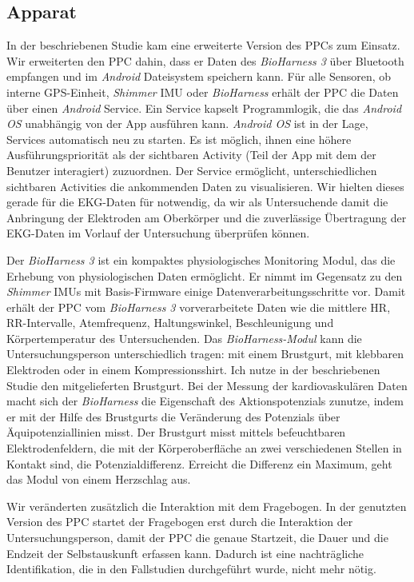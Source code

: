 \subsection{Apparat}
In der beschriebenen Studie kam eine erweiterte Version des \ac{PPC}s zum Einsatz. Wir erweiterten den \ac{PPC} dahin, dass er Daten des \emph{BioHarness 3} über Bluetooth empfangen und im \emph{Android} Dateisystem speichern kann. Für alle Sensoren, ob interne \ac{GPS}-Einheit, \emph{Shimmer} \ac{IMU} oder \emph{BioHarness} erhält der \ac{PPC} die Daten über einen \emph{Android} Service. Ein Service kapselt Programmlogik, die das \emph{Android OS} unabhängig von der App ausführen kann. \emph{Android OS} ist in der Lage, Services automatisch neu zu starten. Es ist möglich, ihnen eine höhere Ausführungspriorität als der sichtbaren Activity (Teil der App mit dem der Benutzer interagiert) zuzuordnen. Der Service ermöglicht, unterschiedlichen sichtbaren Activities die ankommenden Daten zu visualisieren. Wir hielten dieses gerade für die \ac{EKG}-Daten für notwendig, da wir als Untersuchende damit die Anbringung der Elektroden am Oberkörper und die zuverlässige Übertragung der \ac{EKG}-Daten im Vorlauf der Untersuchung überprüfen können. 

Der \emph{BioHarness 3} ist ein kompaktes physiologisches Monitoring Modul, das die Erhebung von physiologischen Daten ermöglicht. Er nimmt im Gegensatz zu den \emph{Shimmer} \acp{IMU} mit Basis-Firmware einige Datenverarbeitungsschritte vor. Damit erhält der \ac{PPC} vom \emph{BioHarness 3} vorverarbeitete Daten wie die mittlere \ac{HR}, RR-Intervalle, Atemfrequenz, Haltungswinkel, Beschleunigung und Körpertemperatur des Untersuchenden. Das \emph{BioHarness-Modul} kann die Untersuchungsperson unterschiedlich tragen: mit einem Brustgurt, mit klebbaren Elektroden oder in einem Kompressionsshirt. Ich nutze in der beschriebenen Studie den mitgelieferten Brustgurt. Bei der Messung der kardiovaskulären Daten macht sich der \emph{BioHarness} die Eigenschaft des Aktionspotenzials zunutze, indem er mit der Hilfe des Brustgurts die Veränderung des Potenzials über Äquipotenziallinien misst. Der Brustgurt misst mittels befeuchtbaren Elektrodenfeldern, die mit der Körperoberfläche an zwei verschiedenen Stellen in Kontakt sind, die Potenzialdifferenz. Erreicht die Differenz ein Maximum, geht das Modul von einem Herzschlag aus. 

Wir veränderten zusätzlich die Interaktion mit dem Fragebogen. In der genutzten Version des \ac{PPC} startet der Fragebogen erst durch die Interaktion der Untersuchungsperson, damit der \ac{PPC} die genaue Startzeit, die Dauer und die Endzeit der Selbstauskunft erfassen kann. Dadurch ist eine nachträgliche Identifikation, die in den Fallstudien durchgeführt wurde, nicht mehr nötig. 

